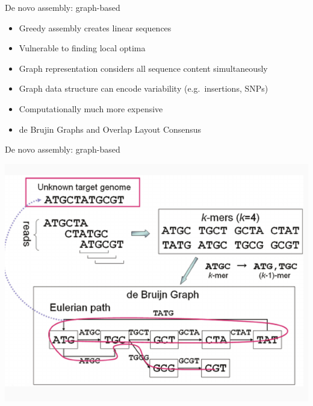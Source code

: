 \documentclass[
  ignorenonframetext,
]{beamer}
\providecommand{\tightlist}{%
  \setlength{\itemsep}{0pt}\setlength{\parskip}{0pt}}
\begin{document}
\begin{frame}{De novo assembly: graph-based}
\label{de-novo-assembly-graph-based}
\Large

\begin{itemize}
\tightlist
\item
  Greedy assembly creates linear sequences
\item
  Vulnerable to finding local optima
\item
  Graph representation considers all sequence content simultaneously
\item
  Graph data structure can encode variability (e.g.~insertions, SNPs)
\item
  Computationally much more expensive
\item
  de Brujin Graphs and Overlap Layout Consensus
\end{itemize}
\end{frame}

\begin{frame}{De novo assembly: graph-based}
\label{de-novo-assembly-graph-based-1}
\center

\includegraphics[width=\textwidth,height=0.8\textheight]{figs/denovograph.png}
\end{frame}
\end{document}
